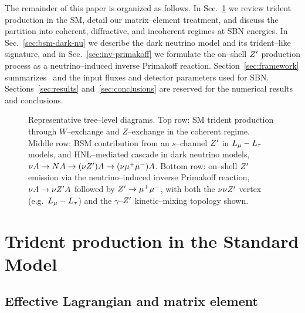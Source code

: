The remainder of this paper is organized as follows.  In
Sec.~\ref{sec:sm-trident} we review trident production in the SM,
detail our matrix--element treatment, and discuss the partition into
coherent, diffractive, and incoherent regimes at SBN energies.  In
Sec.~\ref{sec:bsm-dark-nu} we describe the dark neutrino model and
its trident--like signature, and in Sec.~\ref{sec:inv-primakoff} we
formulate the on--shell $Z^{\prime}$ production process as a neutrino--induced
inverse Primakoff reaction.  Section~\ref{sec:framework} summarizes
\Neptune\ and the input fluxes and detector parameters used for SBN.
Sections~\ref{sec:results} and~\ref{sec:conclusions} are reserved for
the numerical results and conclusions.

\begin{figure}[t]
  \centering
  \caption{Representative tree--level diagrams.  Top row: SM trident
    production through $W$--exchange and $Z$--exchange in the coherent
    regime.  Middle row: BSM contribution from an $s$--channel $Z^{\prime}$ in
    $L_\mu - L_\tau$ models, and HNL--mediated cascade in dark neutrino
    models, $\nu A \to N A \to (\nu Z^{\prime}) A \to (\nu \mu^+\mu^-) A$.
    Bottom row: on--shell $Z^{\prime}$ emission via the neutrino--induced
    inverse Primakoff reaction, $\nu A \to \nu Z^{\prime} A$ followed by
    $Z^{\prime} \to \mu^+\mu^-$, with both the $\nu\nu Z^{\prime}$ vertex (e.g.\
    $L_\mu - L_\tau$) and the $\gamma$--$Z^{\prime}$ kinetic--mixing topology shown.}
  \label{fig:diagrams}
\end{figure}

\section{Trident production in the Standard Model}\label{sec:sm-trident}

\subsection{Effective Lagrangian and matrix element}

